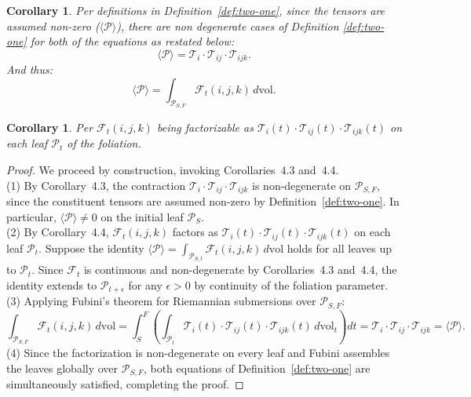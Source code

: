 \documentclass[10pt]{article}
\theoremstyle{plain}
\newtheorem{corollary}[theorem]{Corollary}
\theoremstyle{definition}
\theoremstyle{remark}
\begin{document}
\begin{corollary}
\label{cor:tensor-nz}
  Per definitions in Definition~\ref{def:two-one}, since the tensors are assumed non-zero ($\langle \mathcal{P} \rangle$), there are non degenerate cases of Definition \ref{def:two-one} for both of the equations as restated below:
  \begin{equation}
    \langle \mathcal{P} \rangle = \mathcal{T}_i \cdot \mathcal{T}_{ij} \cdot \mathcal{T}_{ijk}.
  \end{equation}
  And thus:
  \begin{equation}
    \langle \mathcal{P} \rangle = \int_{\mathcal{P}_{S,F}} \mathcal{F}_{t}(i, j, k) \, d\mathrm{vol}.
  \end{equation}
\end{corollary}

\begin{corollary}
\label{cor:three}
  Per $\mathcal{F}_t(i, j, k)$ being factorizable as $\mathcal{T}_i(t) \cdot \mathcal{T}_{ij}(t) \cdot \mathcal{T}_{ijk}(t)$ on each leaf $\mathcal{P}_t$ of the foliation.
\end{corollary}

\begin{proof}
\label{proof:construc}
We proceed by construction, invoking Corollaries~4.3 and~4.4.\\
(1) By Corollary~4.3, the contraction $\mathcal{T}_i \cdot \mathcal{T}_{ij} \cdot \mathcal{T}_{ijk}$ is non-degenerate on $\mathcal{P}_{S,F}$, since the constituent tensors are assumed non-zero by Definition~\ref{def:two-one}. In particular, $\langle \mathcal{P} \rangle \neq 0$ on the initial leaf $\mathcal{P}_S$.\\
(2) By Corollary~4.4, $\mathcal{F}_t(i,j,k)$ factors as $\mathcal{T}_i(t) \cdot \mathcal{T}_{ij}(t) \cdot \mathcal{T}_{ijk}(t)$ on each leaf $\mathcal{P}_t$. Suppose the identity $\langle \mathcal{P} \rangle = \int_{\mathcal{P}_{S,t}} \mathcal{F}_t(i,j,k)\,d\mathrm{vol}$ holds for all leaves up to $\mathcal{P}_t$. Since $\mathcal{F}_t$ is continuous and non-degenerate by Corollaries~4.3 and~4.4, the identity extends to $\mathcal{P}_{t+\epsilon}$ for any $\epsilon > 0$ by continuity of the foliation parameter.\\
(3) Applying Fubini's theorem for Riemannian submersions over $\mathcal{P}_{S,F}$:
\begin{equation}
  \int_{\mathcal{P}_{S,F}} \mathcal{F}_t(i,j,k)\,d\mathrm{vol}
  = \int_{S}^{F} \left(\int_{\mathcal{P}_t} \mathcal{T}_i(t) \cdot \mathcal{T}_{ij}(t) \cdot \mathcal{T}_{ijk}(t)\,d\mathrm{vol}_t\right) dt
  = \mathcal{T}_i \cdot \mathcal{T}_{ij} \cdot \mathcal{T}_{ijk}
  = \langle \mathcal{P} \rangle.
\end{equation}
(4) Since the factorization is non-degenerate on every leaf and Fubini assembles the leaves globally over $\mathcal{P}_{S,F}$, both equations of Definition~\ref{def:two-one} are simultaneously satisfied, completing the proof.
\end{proof}
\end{document}
